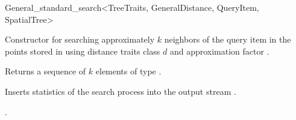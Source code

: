\begin{ccRefClass}{General_standard_search<TreeTraits, GeneralDistance, QueryItem, SpatialTree>}
\newpage

\ccCreation
{}  %


\def\ccLongParamLayout{\ccTrue}
{Constructor for searching approximately $k$ neighbors of the query item  
in the points stored in  using 
distance
traits class $d$ and approximation factor .}

\ccOperations

{Returns a sequence of $k$ elements of type }. 

\begin{ccAdvanced}
{
Inserts statistics of the search process into the output stream .
}
\end{ccAdvanced}

\ccSeeAlso

.

\end{ccRefClass}


